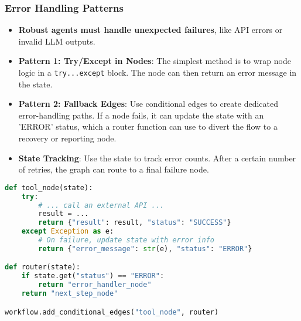 \begin{frame}[fragile]\frametitle{Error Handling Patterns}
      \begin{itemize}
        \item \textbf{Robust agents must handle unexpected failures}, like API errors or invalid LLM outputs.
        \item \textbf{Pattern 1: Try/Except in Nodes}: The simplest method is to wrap node logic in a \texttt{try...except} block. The node can then return an error message in the state.
        \item \textbf{Pattern 2: Fallback Edges}: Use conditional edges to create dedicated error-handling paths. If a node fails, it can update the state with an 'ERROR' status, which a router function can use to divert the flow to a recovery or reporting node.
        \item \textbf{State Tracking}: Use the state to track error counts. After a certain number of retries, the graph can route to a final failure node.
      \end{itemize}
\begin{lstlisting}[language=Python, basicstyle=\tiny]
def tool_node(state):
    try:
        # ... call an external API ...
        result = ...
        return {"result": result, "status": "SUCCESS"}
    except Exception as e:
        # On failure, update state with error info
        return {"error_message": str(e), "status": "ERROR"}

def router(state):
    if state.get("status") == "ERROR":
        return "error_handler_node"
    return "next_step_node"

workflow.add_conditional_edges("tool_node", router)
\end{lstlisting}
\end{frame}

